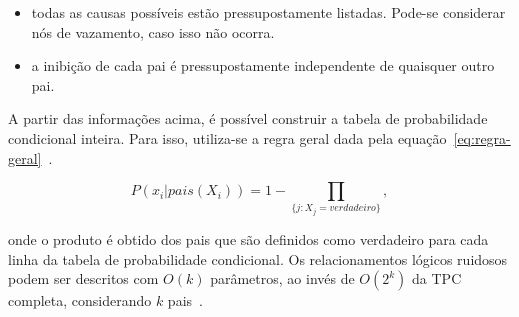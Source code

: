\begin{itemize}
    \item todas as causas possíveis estão pressupostamente listadas. Pode-se considerar nós de vazamento, caso isso não ocorra.
    \item a inibição de cada pai é pressupostamente independente de quaisquer outro pai.
\end{itemize}

A partir das informações acima, é possível construir a tabela de probabilidade condicional inteira. Para isso, utiliza-se a regra geral dada pela equação~\ref{eq:regra-geral}~\cite{russell:2002}.

\begin{equation}
    \label{eq:regra-geral}
    P(x_i|pais(X_i)) = 1 - \prod_{\{j:X_j = verdadeiro\}} ,
\end{equation}

onde o produto é obtido dos pais que são definidos como verdadeiro para cada linha da tabela de probabilidade condicional. Os relacionamentos lógicos ruidosos podem ser descritos com $O(k)$ parâmetros, ao invés de $O(2^k)$ da TPC completa, considerando $k$ pais~\cite{russell:2002}.

